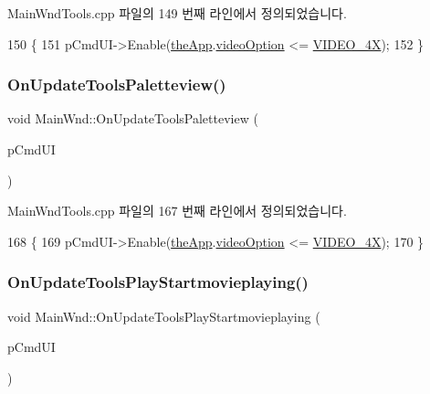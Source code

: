 Main\+Wnd\+Tools.\+cpp 파일의 149 번째 라인에서 정의되었습니다.


\begin{DoxyCode}
150 \{
151   pCmdUI->Enable(\mbox{\hyperlink{_v_b_a_8cpp_a8095a9d06b37a7efe3723f3218ad8fb3}{theApp}}.\mbox{\hyperlink{class_v_b_a_a17dac073149c897f770c00ed7098ad32}{videoOption}} <= \mbox{\hyperlink{_v_b_a_8h_a531c35e38ede3ea4e5ba5afb24b29493a6468bce6b84e6350d3de126f257eb38d}{VIDEO\_4X}});  
152 \}
\end{DoxyCode}
\mbox{\label{class_main_wnd_a0866cdfcf1bbe035762b7dc45b156f98}} 
\subsubsection{\texorpdfstring{On\+Update\+Tools\+Paletteview()}{OnUpdateToolsPaletteview()}}
{\footnotesize\ttfamily void Main\+Wnd\+::\+On\+Update\+Tools\+Paletteview (\begin{DoxyParamCaption}\item[{C\+Cmd\+UI $\ast$}]{p\+Cmd\+UI }\end{DoxyParamCaption})\hspace{0.3cm}{\ttfamily [protected]}}



Main\+Wnd\+Tools.\+cpp 파일의 167 번째 라인에서 정의되었습니다.


\begin{DoxyCode}
168 \{
169   pCmdUI->Enable(\mbox{\hyperlink{_v_b_a_8cpp_a8095a9d06b37a7efe3723f3218ad8fb3}{theApp}}.\mbox{\hyperlink{class_v_b_a_a17dac073149c897f770c00ed7098ad32}{videoOption}} <= \mbox{\hyperlink{_v_b_a_8h_a531c35e38ede3ea4e5ba5afb24b29493a6468bce6b84e6350d3de126f257eb38d}{VIDEO\_4X}});  
170 \}
\end{DoxyCode}
\mbox{\label{class_main_wnd_aca67af593b1041fbdab04ddfd2bf5910}} 
\subsubsection{\texorpdfstring{On\+Update\+Tools\+Play\+Startmovieplaying()}{OnUpdateToolsPlayStartmovieplaying()}}
{\footnotesize\ttfamily void Main\+Wnd\+::\+On\+Update\+Tools\+Play\+Startmovieplaying (\begin{DoxyParamCaption}\item[{C\+Cmd\+UI $\ast$}]{p\+Cmd\+UI }\end{DoxyParamCaption})\hspace{0.3cm}{\ttfamily [protected]}}



